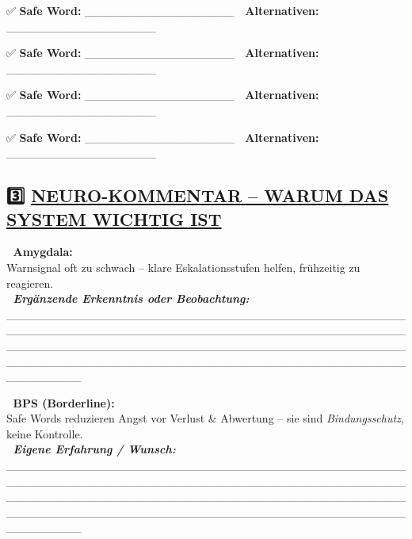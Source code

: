 ✅ \textbf{Safe Word:} \_\_\_\_\_\_\_\_\_\_\_\_\_\_\_\_\_\_ 📝 \textbf{Alternativen:} \_\_\_\_\_\_\_\_\_\_\_\_\_\_\_\_\_\_

✅ \textbf{Safe Word:} \_\_\_\_\_\_\_\_\_\_\_\_\_\_\_\_\_\_ 📝 \textbf{Alternativen:} \_\_\_\_\_\_\_\_\_\_\_\_\_\_\_\_\_\_

✅ \textbf{Safe Word:} \_\_\_\_\_\_\_\_\_\_\_\_\_\_\_\_\_\_ 📝 \textbf{Alternativen:} \_\_\_\_\_\_\_\_\_\_\_\_\_\_\_\_\_\_

✅ \textbf{Safe Word:} \_\_\_\_\_\_\_\_\_\_\_\_\_\_\_\_\_\_ 📝 \textbf{Alternativen:} \_\_\_\_\_\_\_\_\_\_\_\_\_\_\_\_\_\_

\hypertarget{section-2}{%
\subsection{}\label{section-2}}

\hypertarget{neuro-kommentar-warum-das-system-wichtig-ist}{%
\subsection{\texorpdfstring{\textbf{3️⃣ \ul{NEURO-KOMMENTAR -- WARUM DAS SYSTEM WICHTIG IST}}}{3️⃣ NEURO-KOMMENTAR -- WARUM DAS SYSTEM WICHTIG IST}}\label{neuro-kommentar-warum-das-system-wichtig-ist}}

🧠 \textbf{Amygdala:}\\
Warnsignal oft zu schwach -- klare Eskalationsstufen helfen, frühzeitig zu reagieren.\\
📝 \emph{\textbf{Ergänzende Erkenntnis oder Beobachtung:}} \_\_\_\_\_\_\_\_\_\_\_\_\_\_\_\_\_\_\_\_\_\_\_\_\_\_\_\_\_\_\_\_\_\_\_\_\_\_\_\_\_\_\_\_\_\_\_\_\_\_\_\_\_\_\_\_\_\_\_\_\_\_\_\_\_\_\_\_\_\_\_\_\_\_\_\_\_\_\_\_\_\_\_\_\_\_\_\_\_\_\_\_\_\_\_\_\_\_\_\_\_\_\_\_\_\_\_\_\_\_\_\_\_\_\_\_\_\_\_\_\_\_\_\_\_\_\_\_\_\_\_\_\_\_\_\_\_\_\_\_\_\_\_\_\_\_\_\_\_\_\_\_\_\_\_\_\_\_\_\_\_\_\_\_\_\_\_\_\_\_\_\_\_\_\_\_\_\_\_\_\_\_\_\_\_\_\_\_\_\_\_\_\_\_\_\_\_\_\_\_\_

🧠 \textbf{BPS (Borderline):}\\
Safe Words reduzieren Angst vor Verlust \& Abwertung -- sie sind \emph{Bindungsschutz}, keine Kontrolle.\\
📝 \emph{\textbf{Eigene Erfahrung / Wunsch:}} \_\_\_\_\_\_\_\_\_\_\_\_\_\_\_\_\_\_\_\_\_\_\_\_\_\_\_\_\_\_\_\_\_\_\_\_\_\_\_\_\_\_\_\_\_\_\_\_\_\_\_\_\_\_\_\_\_\_\_\_\_\_\_\_\_\_\_\_\_\_\_\_\_\_\_\_\_\_\_\_\_\_\_\_\_\_\_\_\_\_\_\_\_\_\_\_\_\_\_\_\_\_\_\_\_\_\_\_\_\_\_\_\_\_\_\_\_\_\_\_\_\_\_\_\_\_\_\_\_\_\_\_\_\_\_\_\_\_\_\_\_\_\_\_\_\_\_\_\_\_\_\_\_\_\_\_\_\_\_\_\_\_\_\_\_\_\_\_\_\_\_\_\_\_\_\_\_\_\_\_\_\_\_\_\_\_\_\_\_\_\_\_\_\_\_\_\_\_\_\_\_


